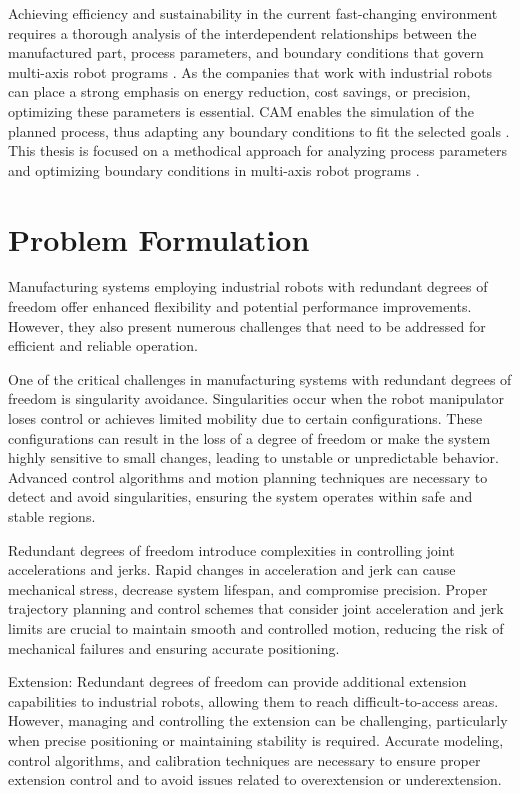 Achieving efficiency and sustainability in the current fast-changing environment requires a thorough analysis of the interdependent relationships between the manufactured part, process parameters, and boundary conditions that govern multi-axis robot programs \cite{Pan}. As the companies that work with industrial robots can place a strong emphasis on energy reduction, cost savings, or precision, optimizing these parameters is essential. CAM enables the simulation of the planned process, thus adapting any boundary conditions to fit the selected goals \cite{Kyratsis.2020,Maiti.2017}.
This thesis is focused on a methodical approach for analyzing process parameters and optimizing boundary conditions in multi-axis robot programs \cite{Pan}. 

\section{Problem Formulation}%
Manufacturing systems employing industrial robots with redundant degrees of freedom offer enhanced flexibility and potential performance improvements. However, they also present numerous challenges that need to be addressed for efficient and reliable operation.

One of the critical challenges in manufacturing systems with redundant degrees of freedom is singularity avoidance. Singularities occur when the robot manipulator loses control or achieves limited mobility due to certain configurations. These configurations can result in the loss of a degree of freedom or make the system highly sensitive to small changes, leading to unstable or unpredictable behavior. Advanced control algorithms and motion planning techniques are necessary to detect and avoid singularities, ensuring the system operates within safe and stable regions.

Redundant degrees of freedom introduce complexities in controlling joint accelerations and jerks. Rapid changes in acceleration and jerk can cause mechanical stress, decrease system lifespan, and compromise precision. Proper trajectory planning and control schemes that consider joint acceleration and jerk limits are crucial to maintain smooth and controlled motion, reducing the risk of mechanical failures and ensuring accurate positioning.

Extension:
Redundant degrees of freedom can provide additional extension capabilities to industrial robots, allowing them to reach difficult-to-access areas. However, managing and controlling the extension can be challenging, particularly when precise positioning or maintaining stability is required. Accurate modeling, control algorithms, and calibration techniques are necessary to ensure proper extension control and to avoid issues related to overextension or underextension.

